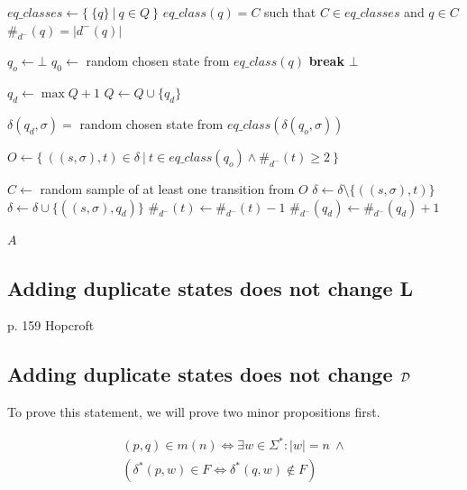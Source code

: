 \vspace{0.2cm}
\begin{algorithmic}[1]
	\State $eq\_classes \gets \{\ \{q\}\ |\ q \in Q\ \}$
	\State $eq\_class(q) = C$ such that $C \in eq\_classes$ and $q \in C$
	\State $\#_{d^-}(q) = |d^-(q)|$
	\State
	
		\State
		\State $q_o \gets \bot$
				\State $q_0 \gets$ random chosen state from $eq\_class(q)$
				\State \textbf{break}
			\EndIf
		\EndFor
			\State \Return $\bot$
		\EndIf
		
		\State
		\State $q_d \gets \max Q + 1$
		\State $Q \gets Q \cup \{ q_d \}$
		
		\State
			\State $\delta(q_d, \sigma) =$ random chosen state from $eq\_class(\delta(q_o, \sigma))$
		\EndFor
		
		\State
		\State $O \gets \{\ ((s, \sigma), t) \in \delta\ |\ t \in eq\_class(q_o) \land \#_{d^-}(t) \geq 2\ \}$
		
		\State $C \gets$ random sample of at least one transition from $O$
			\State $\delta \gets \delta \setminus \{((s, \sigma), t)\}$
			\State $\delta \gets \delta \cup \{((s, \sigma), q_d)\}$
			\State $\#_{d^-}(t) \gets \#_{d^-}(t) - 1$
			\State $\#_{d^-}(q_d) \gets \#_{d^-}(q_d) + 1$
		\EndFor
	\EndFor
	
	\State \Return $A$
	\EndFunction
\end{algorithmic}
\vspace{0.2cm}

\subsection{Adding duplicate states does not change L}

p. 159 Hopcroft

\subsection{Adding duplicate states does not change $\mathcal{D}$}

To prove this statement, we will prove two minor propositions first.

\begin{lemma}[Semantics of $(p,q) \in m(n)$] \label{ch:3:semantics-of-m(n)}
	\begin{multline*}
	(p,q) \in m(n) \Longleftrightarrow 
	\exists w\in\Sigma^*\colon |w| = n\ \land \\
	(\delta^*(p,w) \in F \Leftrightarrow \delta^*(q,w) \notin F)
	\end{multline*}
\end{lemma}

